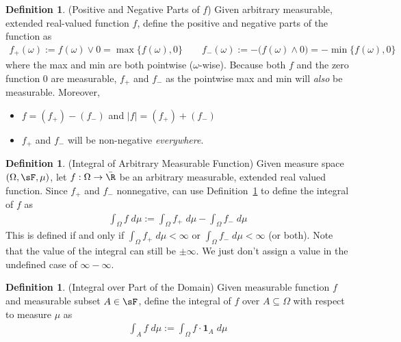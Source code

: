 \documentclass[12pt]{article}
\theoremstyle{plain}
\theoremstyle{definition}
\newtheorem{defn}[thm]{Definition}
\theoremstyle{remark}
\newcommand{\ra}{\rightarrow}
\newcommand{\one}[1]{\mathbf{1}_{#1}}
\begin{document}
\begin{defn}(Positive and Negative Parts of $f$)
\label{lebint}
Given arbitrary measurable, extended real-valued function $f$, define
the positive and negative parts of the function as
\begin{align*}
    f_+(\omega)
    := f(\omega) \vee 0
    = \max\{f(\omega), 0\}
    \qquad
    f_-(\omega)
    := - \big(f(\omega) \wedge 0\big)
    = -\min\{f(\omega), 0\}
\end{align*}
where the max and min are both pointwise ($\omega$-wise).
Because both $f$ and the zero function $0$ are measurable,
$f_+$ and $f_-$ as the pointwise max and min will \emph{also} be
measurable. Moreover,
\begin{itemize}
  \item $f = (f_+) - (f_-)$ and $|f| = (f_+) + (f_-)$
  \item $f_+$ and $f_-$ will be non-negative \emph{everywhere}.
\end{itemize}
\end{defn}

\begin{defn}(Integral of Arbitrary Measurable Function)
\label{lebintarb}
Given measure space $(\Omega,\sF,\mu)$, let
$f:\Omega\ra\bar{\R}$ be an arbitrary measurable, extended real valued
function.
Since $f_+$ and $f_-$ nonnegative, can use
Definition~\ref{lebint} to define the integral of $f$ as
\begin{align*}
  \int_\Omega f\; d\mu := \int_\Omega f_+ \; d\mu - \int_\Omega f_- \; d\mu
\end{align*}
This is defined if and only if
$\int_\Omega f_+ \; d\mu<\infty$ or $\int_\Omega f_- \; d\mu<\infty$
(or both).
Note that the value of the integral can still be $\pm\infty$.
We just don't assign a value in the undefined case of $\infty-\infty$.
\end{defn}

\begin{defn}(Integral over Part of the Domain)
Given measurable function $f$ and measurable subset $A\in\sF$, define
the integral of $f$ over $A\subseteq\Omega $ with respect to measure
$\mu$ as
\begin{align*}
  \int_{A} f\; d\mu
  :=
  \int_{\Omega} f\cdot\one{A}\; d\mu
\end{align*}
\end{defn}
\end{document}
